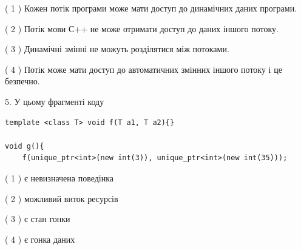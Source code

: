 \documentclass[12pt, ukrainian]{article}
\begin{document}
\begin {large}
{( 1 ) Кожен потік програми може мати доступ до динамічних даних програми.%

( 2 ) Потік мови С++ не може отримати доступ до даних іншого потоку.%

( 3 ) Динамічні змінні не можуть розділятися між потоками.%

( 4 ) Потік може мати доступ до автоматичних змінних іншого потоку і це безпечно.%


5. У цьому фрагменті коду
\begin{verbatim}
template <class T> void f(T a1, T a2){}

void g(){
    f(unique_ptr<int>(new int(3)), unique_ptr<int>(new int(35)));
\end{verbatim}

( 1 ) є невизначена поведінка%

( 2 ) можливий виток ресурсів%

( 3 ) є стан гонки%

( 4 ) є гонка даних%
}
\end {large}
\end{document}
